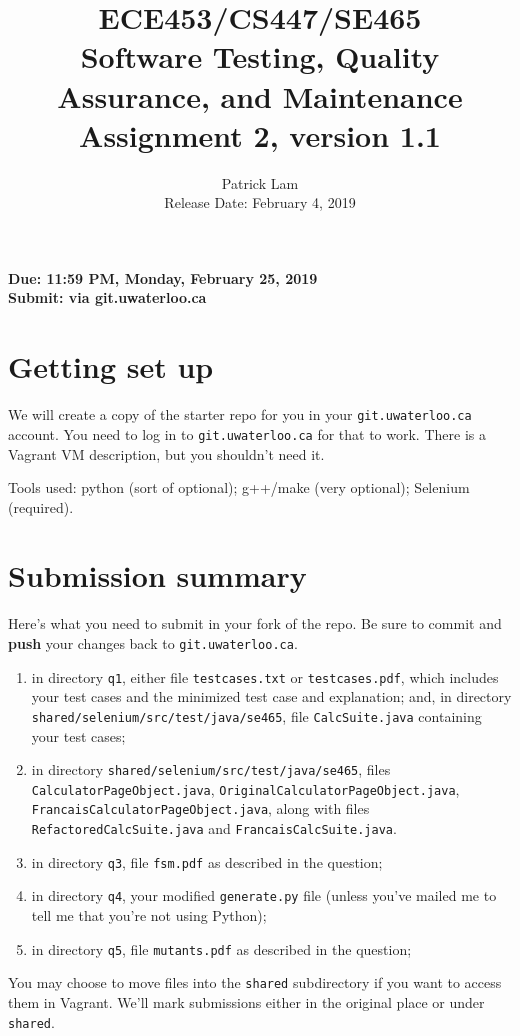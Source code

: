 \documentclass[10pt,hidelinks]{article}
\begin{document}
\title{
ECE453/CS447/SE465 \\
Software Testing, Quality Assurance, and Maintenance\\
Assignment 2, version 1.1}
\author{Patrick Lam \\
{Release Date:  February 4, 2019} \\
}
\renewcommand{\today}{}
\maketitle

\begin{center}

{\bf Due:  11:59 PM, Monday, February 25, 2019} \\
{\bf Submit: via git.uwaterloo.ca }\\
\end{center}

\section*{Getting set up}
We will create a copy of the starter repo for you in your {\tt git.uwaterloo.ca} account. You need to log in to {\tt git.uwaterloo.ca} for that to work. There is a Vagrant VM description,
but you shouldn't need it.

Tools used: python (sort of optional); g++/make (very optional); Selenium (required).

\section*{Submission summary}
Here's what you need to submit in your fork of the repo. Be sure to commit
and {\bf push} your changes back to {\tt git.uwaterloo.ca}.
\begin{enumerate}
\item in directory {\tt q1}, either file {\tt testcases.txt} or {\tt testcases.pdf}, which includes your test cases and the minimized test case and explanation; and, in directory {\tt shared/selenium/src/test/java/se465}, file {\tt CalcSuite.java} containing your test cases;
\item in directory {\tt shared/selenium/src/test/java/se465}, files {\tt CalculatorPageObject.java}, {\tt OriginalCalculatorPageObject.java}, {\tt FrancaisCalculatorPageObject.java}, along with files {\tt RefactoredCalcSuite.java} and {\tt FrancaisCalcSuite.java}.
\item in directory {\tt q3}, file {\tt fsm.pdf} as described in the question;
\item in directory {\tt q4}, your modified {\tt generate.py} file (unless you've mailed me to tell me that you're not using Python);
\item in directory {\tt q5}, file {\tt mutants.pdf} as described in the question;
\end{enumerate}
You may choose to move files into the {\tt shared} subdirectory if you want to access them in Vagrant. We'll mark submissions either in the original place or under {\tt shared}.
 
\end{document}
